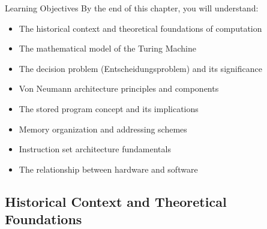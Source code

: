 
\begin{frame}{Learning Objectives}
By the end of this chapter, you will understand:
\begin{itemize}
\item The historical context and theoretical foundations of computation
\item The mathematical model of the Turing Machine
\item The decision problem (Entscheidungsproblem) and its significance
\item Von Neumann architecture principles and components
\item The stored program concept and its implications
\item Memory organization and addressing schemes
\item Instruction set architecture fundamentals
\item The relationship between hardware and software
\end{itemize}
\end{frame}

\subsection{Historical Context and Theoretical Foundations}

